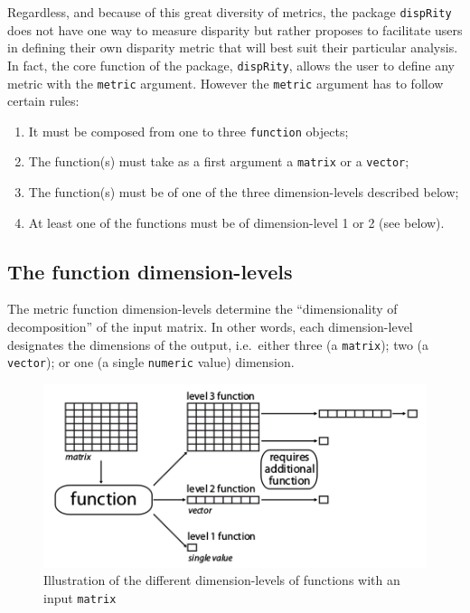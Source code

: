 \documentclass[
]{book}
\providecommand{\tightlist}{%
  \setlength{\itemsep}{0pt}\setlength{\parskip}{0pt}}
\begin{document}
Regardless, and because of this great diversity of metrics, the package \texttt{dispRity} does not have one way to measure disparity but rather proposes to facilitate users in defining their own disparity metric that will best suit their particular analysis.
In fact, the core function of the package, \texttt{dispRity}, allows the user to define any metric with the \texttt{metric} argument.
However the \texttt{metric} argument has to follow certain rules:

\begin{enumerate}
\def\labelenumi{\arabic{enumi}.}
\tightlist
\item
  It must be composed from one to three \texttt{function} objects;
\item
  The function(s) must take as a first argument a \texttt{matrix} or a \texttt{vector};
\item
  The function(s) must be of one of the three dimension-levels described below;
\item
  At least one of the functions must be of dimension-level 1 or 2 (see below).
\end{enumerate}

\hypertarget{the-function-dimension-levels}{%
\subsection{The function dimension-levels}\label{the-function-dimension-levels}}

The metric function dimension-levels determine the ``dimensionality of decomposition'' of the input matrix.
In other words, each dimension-level designates the dimensions of the output, i.e.~either three (a \texttt{matrix}); two (a \texttt{vector}); or one (a single \texttt{numeric} value) dimension.

\begin{figure}
\centering
\includegraphics{dispRity_fun.png}
\caption{Illustration of the different dimension-levels of functions with an input \texttt{matrix}}
\end{figure}
\end{document}
